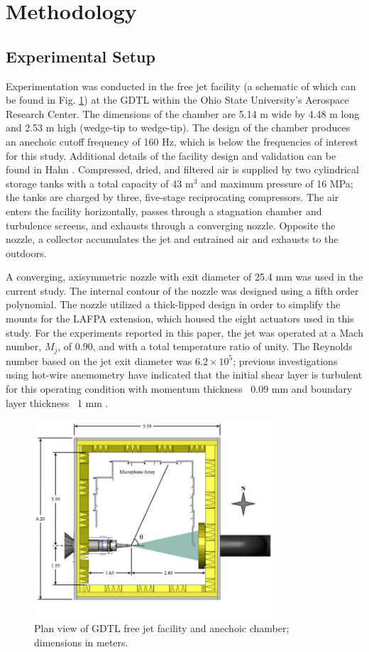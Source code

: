 \documentclass[english]{aiaa-tc}
\begin{document}
\section{Methodology}
\subsection{Experimental Setup\label{expersetup}}
Experimentation was conducted in the free jet facility (a schematic of which can be found in Fig. \ref{GDTLschematic}) at the GDTL within the Ohio State University's Aerospace Research Center. 
The dimensions of the chamber are 5.14 m wide by 4.48 m long and 2.53 m high (wedge-tip to wedge-tip). 
The design of the chamber produces an anechoic cutoff frequency of 160 Hz, which is below the frequencies of interest for this study. 
Additional details of the facility design and validation can be found in Hahn \cite{Hahn2011}. 
Compressed, dried, and filtered air is supplied by two cylindrical storage tanks with a total capacity of 43 m$^3$ and maximum pressure of 16 MPa; the tanks are charged by three, five-stage reciprocating compressors. 
The air enters the facility horizontally, passes through a stagnation chamber and turbulence screens, and exhausts through a converging nozzle. 
Opposite the nozzle, a collector accumulates the jet and entrained air and exhausts to the outdoors.

A converging, axisymmetric nozzle with exit diameter of 25.4 mm was used in the current study. 
The internal contour of the nozzle was designed using a fifth order polynomial. The nozzle utilized a thick-lipped design in order to simplify the mounts for the LAFPA extension, which housed the eight actuators used in this study. 
For the experiments reported in this paper, the jet was operated at a Mach number, $M_{j}$, of 0.90, and with a total temperature ratio of unity. 
The Reynolds number based on the jet exit diameter was $6.2 \times 10^{5}$; previous investigations using hot-wire anemometry have indicated that the initial shear layer is turbulent for this operating condition with momentum thickness ~0.09 mm and boundary layer thickness ~1 mm \cite{kfm2009-1}. 
\begin{figure}
	\begin{center}
		\includegraphics[width=3.5in]{GDTL_facility_schematic.png}
		\caption{Plan view of GDTL free jet facility and anechoic chamber; dimensions in meters.}\label{GDTLschematic}
	\end{center}
\end{figure}
	
\end{document}
